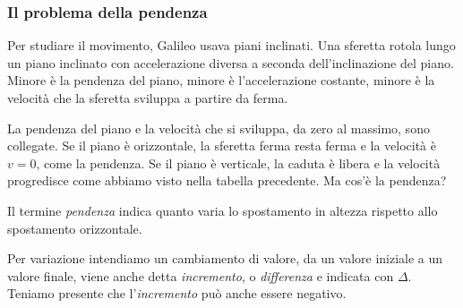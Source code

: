 \subsubsection{Il problema della pendenza}
\label{subsec:differenziazione_pendenza}
Per studiare il movimento, Galileo usava piani inclinati. 
Una sferetta rotola lungo un piano inclinato con accelerazione diversa a 
seconda dell'inclinazione del piano. 
Minore è la pendenza del piano, minore è l'accelerazione costante, 
minore è la velocità che la sferetta sviluppa a partire da ferma. 

La pendenza del piano e la velocità che si sviluppa, da zero al massimo, 
sono collegate. 
Se il piano è orizzontale, la sferetta ferma resta ferma e la velocità è 
\(v=0\), come la pendenza. 
Se il piano è verticale, la caduta è libera e la velocità progredisce 
come abbiamo visto nella tabella precedente. 
Ma cos'è la pendenza? 
\begin{definizione}[Pendenza]
Il termine \emph{pendenza} indica quanto varia lo spostamento in altezza 
rispetto allo spostamento orizzontale. 
\end{definizione}

Per variazione intendiamo un cambiamento di valore, da un valore iniziale a 
un valore finale, viene anche detta \emph{incremento}, o \emph{differenza} e 
indicata con \(\Delta\). Teniamo presente che l'\emph{incremento} può anche 
essere negativo.

